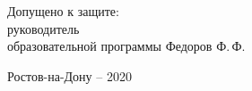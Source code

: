 \begin{singlespacing}
\begin{center}
\vspace{15mm}

\noindent
\begin{flushleft}
Допущено к защите:\\
руководитель \\
образовательной программы \underline{\hspace*{65mm}} Федоров Ф.\,Ф.
\end{flushleft}




\vfill
Ростов-на-Дону -- 2020

\end{center} 

\singlespacing
\end{singlespacing}